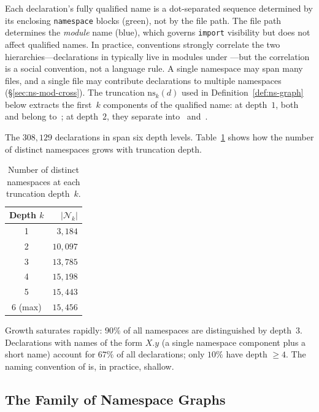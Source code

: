 \noindent
Each declaration's fully qualified name is a dot-separated sequence determined by its enclosing \texttt{namespace} blocks (\textcolor{green!50!black}{green}), not by the file path. The file path determines the \emph{module} name (\textcolor{blue!60!black}{blue}), which governs \texttt{import} visibility but does not affect qualified names. In practice,  conventions strongly correlate the two hierarchies---declarations in  typically live in modules under ---but the correlation is a social convention, not a language rule. A single namespace may span many files, and a single file may contribute declarations to multiple namespaces (\S\ref{sec:ns-mod-cross}). The truncation $\mathrm{ns}_k(d)$ used in Definition~\ref{def:ns-graph} below extracts the first~$k$ components of the qualified name: at depth~$1$, both  and  belong to~; at depth~$2$, they separate into~ and~.

The $308{,}129$ declarations in  span six depth levels. Table~\ref{tab:ns-depth-count} shows how the number of distinct namespaces grows with truncation depth.

\begin{table}[ht]
\centering
\caption{Number of distinct namespaces at each truncation depth~$k$.}
\label{tab:ns-depth-count}
\begin{tabular}{cr}
\toprule
Depth $k$ & $|\mathcal{N}_k|$ \\
\midrule
1          & $3{,}184$ \\
2          & $10{,}097$ \\
3          & $13{,}785$ \\
4          & $15{,}198$ \\
5          & $15{,}443$ \\
6 (max)    & $15{,}456$ \\
\bottomrule
\end{tabular}
\end{table}

Growth saturates rapidly: $90\%$ of all namespaces are distinguished by depth~$3$. Declarations with names of the form $X.y$ (a single namespace component plus a short name) account for $67\%$ of all declarations; only $10\%$ have depth $\ge 4$. The naming convention of  is, in practice, shallow.

\subsection{The Family of Namespace Graphs}
\label{sec:ns-definition}

